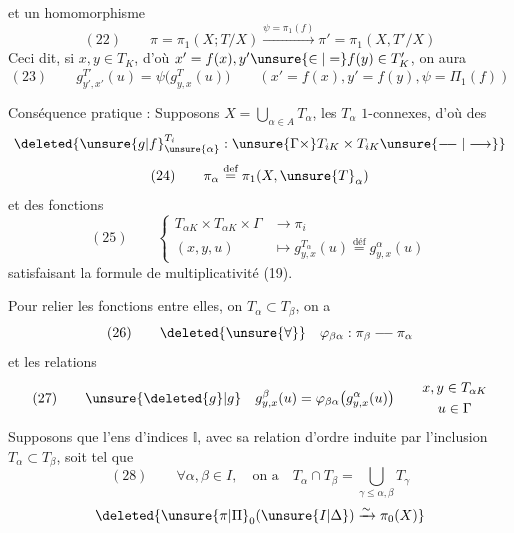 et un homomorphisme
\[
(22)\qquad
\pi=\pi_1(X;T/X)
\overset{\psi=\pi_1(f)}{\longrightarrow}
\pi'=\pi_1(X,T'/X)
\]
Ceci dit, si $x,y\in T_K$, d'où
$x'=f(x),y'\unsure{\in|=}f(y)\in T'_K$, on aura
\[
(23)\qquad
g_{y',x'}^{T'}(u)=\psi\bigl(g_{y,x}^{T}(u)\bigr)
\qquad
(x'=f(x),y'=f(y),\psi=\Pi_1(f))
\]

Conséquence pratique : Supposons
$X=\bigcup_{\alpha\in A}T_\alpha$, les $T_\alpha$ $1$-connexes,
d'où des  
\[
\deleted{
\unsure{g|f}_{\unsure{\alpha}}^{T_i}:
\unsure{\Gamma\times}T_{iK}\times T_{iK}
\unsure{\relbar\joinrel\relbar|\longrightarrow}
}
\]
\[
(24)\qquad
\pi_\alpha\overset{\text{def}}{=}\pi_1(X,\unsure{T}_\alpha)
\]
et des fonctions
\[
(25)\qquad
\left\{\begin{aligned}
T_{\alpha K}\times T_{\alpha K}\times\Gamma
&\longrightarrow\pi_i\\
(x,y,u)&\longmapsto
g_{y,x}^{T_\alpha}(u)\overset{\text{déf}}{=}g_{y,x}^{\alpha}(u)
\end{aligned}\right.
\]
satisfaisant la formule de multiplicativité (19).

Pour relier les fonctions entre elles, 
on 
 $T_\alpha\subset T_\beta$, on a
\[
(26)\qquad
\deleted{\unsure{\forall}}\quad
\varphi_{\beta\alpha}:\pi_\beta
\mathbin{\relbar\joinrel\relbar}\pi_\alpha
\]
et les relations
\[
(27)\qquad
\unsure{\deleted{g}|g}\quad
g_{y,x}^{\beta}(u)
=\varphi_{\beta\alpha}\bigl(g_{y,x}^{\alpha}(u)\bigr)
\qquad
\begin{gathered}
x,y\in T_{\alpha K}\\
u\in\Gamma
\end{gathered}
\]
Supposons que l'ens d'indices $\mathbb{I}$,
avec sa relation d'ordre induite par l'inclusion
$T_\alpha\subset T_\beta$, soit tel que
\[
(28)\qquad
\forall\alpha,\beta\in I,\quad\text{on a}\quad
T_\alpha\cap T_\beta
=\bigcup_{\gamma\le\alpha,\beta}T_\gamma
\]
\[
\deleted{\unsure{\pi|\Pi}_0(\unsure{I|\Delta})\xrightarrow{\sim}\pi_0(X)}
\]
